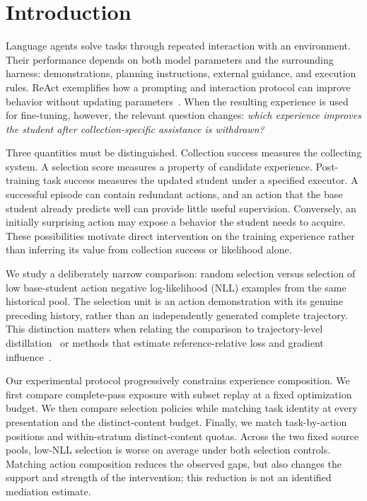\section{Introduction}
\label{sec:intro}
Language agents solve tasks through repeated interaction with an environment. Their performance depends on both model parameters and the surrounding harness: demonstrations, planning instructions, external guidance, and execution rules. ReAct exemplifies how a prompting and interaction protocol can improve behavior without updating parameters~\citep{yao2023react}. When the resulting experience is used for fine-tuning, however, the relevant question changes: \emph{which experience improves the student after collection-specific assistance is withdrawn?}

Three quantities must be distinguished. Collection success measures the collecting system. A selection score measures a property of candidate experience. Post-training task success measures the updated student under a specified executor. A successful episode can contain redundant actions, and an action that the base student already predicts well can provide little useful supervision. Conversely, an initially surprising action may expose a behavior the student needs to acquire. These possibilities motivate direct intervention on the training experience rather than inferring its value from collection success or likelihood alone.

We study a deliberately narrow comparison: random selection versus selection of low base-student action negative log-likelihood (NLL) examples from the same historical pool. The selection unit is an action demonstration with its genuine preceding history, rather than an independently generated complete trajectory. This distinction matters when relating the comparison to trajectory-level distillation~\citep{tang2026smartad} or methods that estimate reference-relative loss and gradient influence~\citep{lin2024rho,xia2024less}.

Our experimental protocol progressively constrains experience composition. We first compare complete-pass exposure with subset replay at a fixed optimization budget. We then compare selection policies while matching task identity at every presentation and the distinct-content budget. Finally, we match task-by-action positions and within-stratum distinct-content quotas. Across the two fixed source pools, low-NLL selection is worse on average under both selection controls. Matching action composition reduces the observed gaps, but also changes the support and strength of the intervention; this reduction is not an identified mediation estimate.


